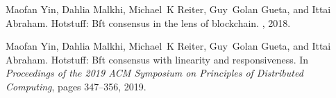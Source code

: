 \begin{thebibliography}{10}
Maofan Yin, Dahlia Malkhi, Michael~K Reiter, Guy~Golan Gueta, and Ittai
  Abraham.
\newblock Hotstuff: Bft consensus in the lens of blockchain.
, 2018.

Maofan Yin, Dahlia Malkhi, Michael~K Reiter, Guy~Golan Gueta, and Ittai
  Abraham.
\newblock Hotstuff: Bft consensus with linearity and responsiveness.
\newblock In {\em Proceedings of the 2019 ACM Symposium on Principles of
  Distributed Computing}, pages 347--356, 2019.

\end{thebibliography}



 
 
 



%
%